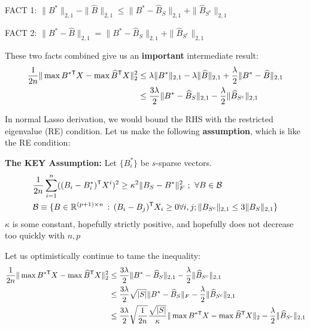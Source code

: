 \documentclass{article}
\begin{document}
FACT 1: $ \| B^* \|_{2,1} - \|\hat{B}\|_{2,1} \leq \| B^* - \hat{B}_S \|_{2,1} + \| \hat{B}_{S^c} \|_{2,1}$

FACT 2: $\| B^* - \hat{B} \|_{2,1} = \| B^* - \hat{B}_S \|_{2,1} + \| \hat{B}_{S^c} \|_{2,1}$

These two facts combined give us an \textbf{important} intermediate result:
\begin{align}
\frac{1}{2n}  \| \max B^{* \mathsf{T}} X - \max \widehat{B}^{\mathsf{T}} X  \|_2^2  &\leq \lambda \| B^* \|_{2,1} - \lambda \|\widehat{B}\|_{2,1}  + \frac{\lambda}{2} \| B^* - \widehat{B} \|_{2,1}  \notag \\
			&\leq \frac{3\lambda}{2} \| B^* - \widehat{B}_S \|_{2,1} - \frac{\lambda}{2} \| \widehat{B}_{S^c} \|_{2,1} \label{eqn:intermediate}
\end{align}

In normal Lasso derivation, we would bound the RHS with the restricted eigenvalue (RE) condition. Let us make the following \textbf{assumption}, which is like the RE condition:\\

\begin{framed}
\textbf{The KEY Assumption:} Let $\{ B^*_i \}$ be $s$-sparse vectors.
\begin{align*}
 & \frac{1}{2n} \sum_{i=1}^n ((B_i - B^*_i)^{\mathsf{T}} X^i)^2 \geq \kappa^2 \| B_S - B^* \|^2_F \,\,;\:\,\forall B \in \mathcal{B} \\ 
			& \mathcal{B} \equiv \{ B \in \mathbb{R}^{(p+1) \times n} \,:\, (B_i - B_j)^{\mathsf{T}} X_i \geq 0 \forall i,j ; \|B_{S^c}\|_{2,1} \leq 3 \| B_S \|_{2,1}\}
\end{align*}
$\kappa$ is some constant, hopefully strictly positive, and hopefully does not decrease too quickly with $n, p$
\end{framed}

Let us optimistically continue to tame the inequality:
\begin{align*}
\frac{1}{2n}  \| \max B^{* \mathsf{T}} X - \max \widehat{B}^{\mathsf{T}} X  \|_2^2 &\leq \frac{3\lambda}{2} \| B^* - \widehat{B}_S \|_{2,1} - \frac{\lambda}{2} \| \widehat{B}_{S^c} \|_{2,1}\\
				&\leq \frac{3 \lambda}{2} \sqrt{|S|} \| B^* - \widehat{B}_S \|_F - \frac{\lambda}{2} \|\widehat{B}_{S^c} \|_{2,1} \\
				&\leq \frac{3 \lambda}{2}\sqrt{\frac{1}{2n}} \frac{\sqrt{|S|}}{\kappa} \| \max B^{* \mathsf{T}} X - \max \widehat{B}^{\mathsf{T}} X \|_2 - \frac{\lambda}{2} \|\widehat{B}_{S^c} \|_{2,1}
\end{align*}
\end{document}

